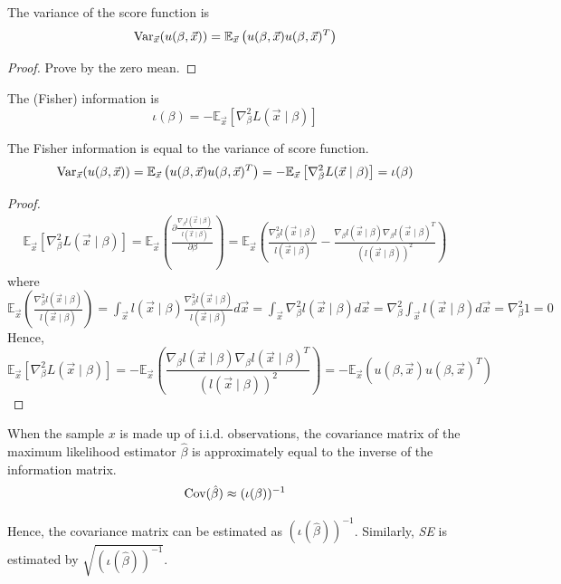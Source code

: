 \documentclass[11pt]{elegantbook}
\begin{document}
\begin{lemma}
    The variance of the score function is $$\textnormal{Var}_{\vec{x}}(u(\beta, \vec{x}))= \mathbb{E}_{\vec{x}}\left(u(\beta, \vec{x})u(\beta, \vec{x})^T\right)$$
\end{lemma}
\begin{proof}
    Prove by the zero mean.
\end{proof}

\begin{definition}
    The (Fisher) information is $$\iota(\beta)=-\mathbb{E}_{\vec{x}}\left[\nabla^2_\beta L(\vec{x}\mid\beta)\right]$$
\end{definition}
\begin{lemma}
    The Fisher information is equal to the variance of score function.
    $$\textnormal{Var}_{\vec{x}}(u(\beta, \vec{x}))=\mathbb{E}_{\vec{x}}\left(u(\beta,\vec{x})u(\beta,\vec{x})^T\right)=-\mathbb{E}_{\vec{x}}\left[\nabla^2_\beta L(\vec{x}\mid\beta)\right]=\iota(\beta)$$
\end{lemma}
\begin{proof}
    \begin{equation}
        \begin{aligned}
            \mathbb{E}_{\vec{x}}\left[\nabla^2_\beta L(\vec{x}\mid\beta)\right]=\mathbb{E}_{\vec{x}}\left(\frac{\partial \frac{\nabla_{\beta} l(\vec{x}\mid \beta)}{l(\vec{x}\mid \beta)}}{\partial \beta}\right)=\mathbb{E}_{\vec{x}}\left(\frac{\nabla^2_{\beta} l(\vec{x}\mid \beta)}{l(\vec{x}\mid \beta)}-\frac{\nabla_{\beta} l(\vec{x}\mid \beta)\nabla_{\beta} l(\vec{x}\mid \beta)^T}{(l(\vec{x}\mid \beta))^2} \right)
        \end{aligned}
        \nonumber
    \end{equation}
    where $\mathbb{E}_{\vec{x}}\left(\frac{\nabla^2_{\beta} l(\vec{x}\mid \beta)}{l(\vec{x}\mid \beta)}\right)=\int_{\vec{x}}l(\vec{x}\mid \beta)\frac{\nabla^2_{\beta} l(\vec{x}\mid \beta)}{l(\vec{x}\mid \beta)}d \vec{x}=\int_{\vec{x}}\nabla^2_{\beta} l(\vec{x}\mid \beta)d \vec{x}=\nabla^2_{\beta}\int_{\vec{x}} l(\vec{x}\mid \beta)d \vec{x}=\nabla^2_{\beta} 1=0$
    Hence, $$\mathbb{E}_{\vec{x}}\left[\nabla^2_\beta L(\vec{x}\mid\beta)\right]=-\mathbb{E}_{\vec{x}}\left(\frac{\nabla_{\beta} l(\vec{x}\mid \beta)\nabla_{\beta} l(\vec{x}\mid \beta)^T}{(l(\vec{x}\mid \beta))^2} \right)=-\mathbb{E}_{\vec{x}}\left(u(\beta,\vec{x})u(\beta,\vec{x})^T\right)$$
\end{proof}

\begin{proposition}
    When the sample $x$ is made up of i.i.d. observations, the covariance matrix of the maximum likelihood estimator $\hat{\beta}$ is approximately equal to the inverse of the information matrix. $$\textnormal{Cov}(\hat{\beta})\approx(\iota(\beta))^{-1}$$
\end{proposition}
Hence, the covariance matrix can be estimated as $(\iota(\hat{\beta}))^{-1}$. Similarly, \textit{SE} is estimated by $\sqrt{(\iota(\hat{\beta}))^{-1}}$.
\end{document}
